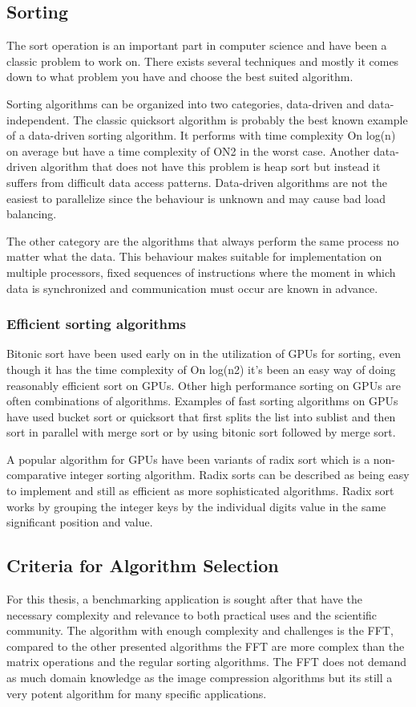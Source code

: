 \subsection{Sorting}
The sort operation is an important part in computer science and have been a classic problem to work on. There exists several techniques and mostly it comes down to what problem you have and choose the best suited algorithm.

Sorting algorithms can be organized into two categories, data-driven and data-independent. The classic quicksort algorithm is probably the best known example of a data-driven sorting algorithm. It performs with time complexity On log(n) on average but have a time complexity of ON2 in the worst case. Another data-driven algorithm that does not have this problem is heap sort but instead it suffers from difficult data access patterns. Data-driven algorithms are not the easiest to parallelize since the behaviour is unknown and may cause bad load balancing.

The other category are the algorithms that always perform the same process no matter what the data. This behaviour makes suitable for implementation on multiple processors, fixed sequences of instructions where the moment in which data is synchronized and communication must occur are known in advance.

\subsubsection{Efficient sorting algorithms}
Bitonic sort have been used early on in the utilization of GPUs for sorting, even though it has the time complexity of On log(n2) it's been an easy way of doing reasonably efficient sort on GPUs. Other high performance sorting on GPUs are often combinations of algorithms. Examples of fast sorting algorithms on GPUs have used bucket sort or quicksort that first splits the list into sublist and then sort in parallel with merge sort or by using bitonic sort followed by merge sort.

A popular algorithm for GPUs have been variants of radix sort which is a non-comparative integer sorting algorithm. Radix sorts can be described as being easy to implement and still as efficient as more sophisticated algorithms. Radix sort works by grouping the integer keys by the individual digits value in the same significant position and value.

\subsection{Criteria for Algorithm Selection}
For this thesis, a benchmarking application is sought after that have the necessary complexity and relevance to both practical uses and the scientific community. The algorithm with enough complexity and challenges is the FFT, compared to the other presented algorithms the FFT are more complex than the matrix operations and the regular sorting algorithms. The FFT does not demand as much domain knowledge as the image compression algorithms but its still a very potent algorithm for many specific applications.

